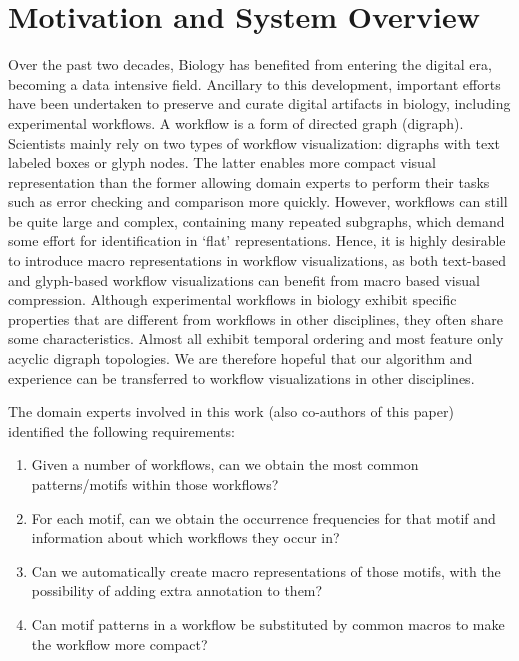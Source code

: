 \section{Motivation and System Overview}
\label{sec:Motivation}

Over the past two decades, Biology has benefited from entering the digital era, becoming a data intensive field.
Ancillary to this development, important efforts have been undertaken to preserve and curate digital artifacts in biology, including experimental workflows.
A workflow is a form of directed graph (digraph).
Scientists mainly rely on two types of workflow visualization:  digraphs with text labeled boxes or glyph nodes.
The latter enables more compact visual representation than the former \cite{Maguire:2012:TVCG} allowing domain experts to perform their tasks such as error checking and comparison more quickly.
However, workflows can still be quite large and complex, containing many repeated subgraphs, which demand some effort for identification in `flat' representations.  
Hence, it is highly desirable to introduce macro representations in workflow visualizations, as both text-based and glyph-based workflow visualizations can benefit from macro based visual compression.
Although experimental workflows in biology exhibit specific properties that are different from workflows in other disciplines, they often share some characteristics.
Almost all exhibit temporal ordering and most feature only acyclic digraph topologies.
We are therefore hopeful that our algorithm and experience can be transferred to workflow visualizations in other disciplines.

The domain experts involved in this work (also co-authors of this paper) identified the following requirements: 

\vspace{-2mm}
\begin{enumerate}[itemsep=-1mm]
\item Given a number of workflows, can we obtain the most common patterns/motifs within those workflows?
\item For each motif, can we obtain the occurrence frequencies for that motif and information about which workflows they occur in?
\item Can we automatically create macro representations of those motifs, with the possibility of adding extra annotation to them?
\item Can motif patterns in a workflow be substituted by common macros to make the workflow more compact?
\end{enumerate}

